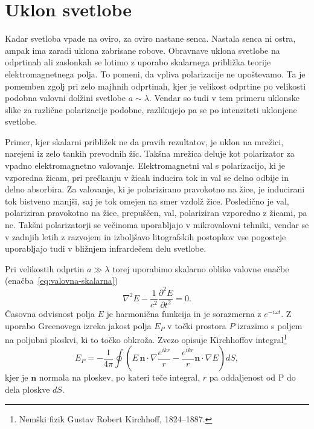 \section{Uklon svetlobe}
Kadar svetloba vpade na oviro, za oviro nastane senca. Nastala senca ni ostra, ampak
ima zaradi uklona zabrisane robove. Obravnave 
uklona svetlobe na odprtinah ali zaslonkah se lotimo z uporabo
skalarnega približka teorije elektromagnetnega polja. To pomeni, da vpliva 
polarizacije ne upoštevamo. Ta je pomemben zgolj pri zelo majhnih odprtinah, 
kjer je velikost odprtine po velikosti podobna valovni dolžini svetlobe $a \sim \lambda$. 
Vendar so tudi v tem primeru uklonske slike za različne polarizacije podobne, 
razlikujejo pa se po intenziteti uklonjene svetlobe.

\begin{remark}
Primer, kjer skalarni približek ne da pravih rezultatov, je uklon na mrežici, narejeni 
iz zelo tankih prevodnih žic. Takšna mrežica deluje kot polarizator za vpadno elektromagnetno valovanje.
Elektromagnetni val s polarizacijo, ki je vzporedna žicam, pri prečkanju v žicah inducira tok
in val se delno odbije in delno absorbira. Za valovanje, ki je polarizirano pravokotno 
na žice, je  inducirani tok bistveno manjši, saj je tok omejen na smer
vzdolž žice. Posledično je val, polariziran pravokotno na žice, prepuščen, 
val, polariziran vzporedno z žicami, pa ne. 
Takšni polarizatorji se večinoma uporabljajo v mikrovalovni tehniki, 
vendar se v zadnjih letih z razvojem in izboljšavo litografskih postopkov
vse pogosteje uporabljajo tudi v bližnjem infrardečem delu svetlobe.
\end{remark}

Pri velikostih odprtin $a\gg\lambda$ torej uporabimo skalarno obliko valovne enačbe 
(enačba~\ref{eq:valovna-skalarna})
\begin{equation}
\nabla^2 E - \frac{1}{c^2}\frac{\partial^2 E}{\partial t^2} = 0.
\label{eq:skalarna-valovna-enačba}
\end{equation}
Časovna odvisnost polja $E$ je harmonična funkcija in 
je sorazmerna z $e^{-i \omega t}$. Z uporabo Greenovega izreka 
jakost polja $E_P$ v točki prostora $P$ izrazimo s poljem na 
poljubni ploskvi, ki to točko obkroža. 
Zvezo opisuje Kirchhoffov integral\footnote{Nemški fizik Gustav Robert Kirchhoff, 1824--1887.} 
\begin{equation}
E_P = -\frac{1}{4\pi}\oint \left(E\,\mathbf{n}\cdot \nabla \frac{e^{ikr}}{r}-
\frac{e^{ikr}}{r}\mathbf{n}\cdot \nabla E \right) dS,
\label{eq:Kirchhoffov-integral}
\end{equation}
kjer je $\mathbf{n}$ normala na ploskev, po kateri teče integral, $r$ pa oddaljenost od P
do dela ploskve $dS$. 


